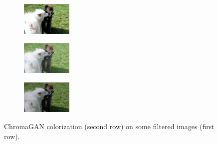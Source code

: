 \begin{figure}[t]
\begin{subfigure}[b]{0.1\textwidth}
		\end{subfigure}
		\hfill
		\begin{subfigure}[b]{0.1\textwidth}
			\includegraphics[width=2.4cm]{c - filter - man contr (2).jpg}
	
		\end{subfigure}
		\hfill
		\begin{subfigure}[b]{0.1\textwidth}
			\includegraphics[width=2.4cm]{c - filter - lumin (1).jpeg}
	
		\end{subfigure}
		\hfill
		\begin{subfigure}[b]{0.1\textwidth}
			\includegraphics[width=2.4cm]{c - filter - lumin (2).jpeg}
	
		\end{subfigure}
	\caption{{\small ChromaGAN colorization (second row) on some filtered images (first row).}}
	\label{fig:filter}
\end{figure}